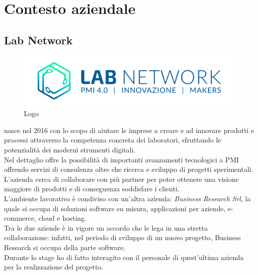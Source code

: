 
\chapter{Contesto aziendale}
\label{cap:introduzione}

\section{Lab Network}

\begin{figure}[H]
	\begin{center}
	\includegraphics[scale=0.4]{immagini/LOGO_LABNETWORK.png}
	\caption{Logo \lab{}}
	\end{center}
\end{figure}

\lab{} nasce nel 2016 con lo scopo di aiutare le imprese a creare e ad innovare prodotti e processi attraverso la competenza concreta dei laboratori, sfruttando le potenzialità dei moderni strumenti digitali.\\
Nel dettaglio \lab{} offre la possibilità di importanti avanzamenti tecnologici a PMI offrendo servizi di consulenza oltre che ricerca e sviluppo di progetti sperimentali.\\
L'azienda cerca di collaborare con più partner per poter ottenere una visione maggiore di prodotti e di conseguenza soddisfare i clienti.\\
L'ambiente lavorativo è condiviso con un'altra azienda: \textit{Business Research Srl}, la quale si occupa di soluzioni software su misura, applicazioni per aziende, e-commerce, cloud e hosting.\\
Tra le due aziende è in vigore un accordo che le lega in una stretta collaborazione: infatti, nel periodo di sviluppo di un nuovo progetto, Business Research si occupa della parte software.\\
Durante lo stage ho di fatto interagito con il personale di quest'ultima azienda per la realizzazione del progetto.

